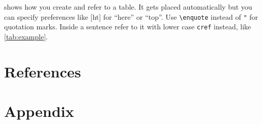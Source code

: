 \documentclass[headsepline,titlepage,twoside,12pt,toc=flat,headings=normal]{scrreprt}
\begin{document}
 shows how you create and refer to a table.
It gets placed automatically but you can specify preferences like [ht] for \enquote{here} or \enquote{top}.
Use \verb+\enquote+ instead of \verb+"+ for quotation marks.
Inside a sentence refer to it with lower case \verb+cref+ instead, like \cref{tab:example}.


\chapter{References}\label{ch:references}



\chapter{Appendix}\label{ch:appendix}
\end{document}
